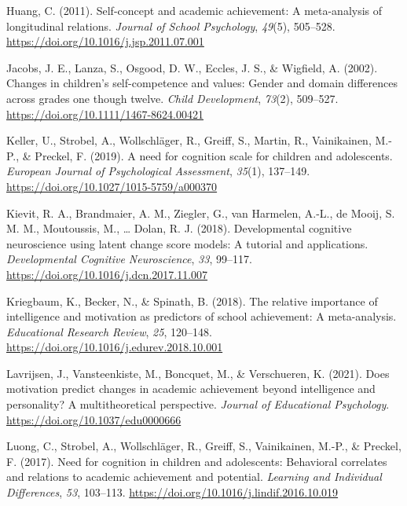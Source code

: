 \documentclass[
  man]{apa6}
\newlength{\cslhangindent}
\newlength{\cslentryspacingunit} %
\newenvironment{CSLReferences}[2] %
 {%
  \setlength{\parindent}{0pt}
  \ifodd #1
  \let\oldpar\par
  \def\par{\hangindent=\cslhangindent\oldpar}
  \fi
  \setlength{\parskip}{#2\cslentryspacingunit}
 }%
 {}
\begin{document}
\begin{CSLReferences}{1}{0}
\leavevmode{}%
Huang, C. (2011). Self-concept and academic achievement: A meta-analysis of longitudinal relations. \emph{Journal of School Psychology}, \emph{49}(5), 505--528. \url{https://doi.org/10.1016/j.jsp.2011.07.001}

\leavevmode{}%
Jacobs, J. E., Lanza, S., Osgood, D. W., Eccles, J. S., \& Wigfield, A. (2002). Changes in children's self-competence and values: Gender and domain differences across grades one though twelve. \emph{Child Development}, \emph{73}(2), 509--527. \url{https://doi.org/10.1111/1467-8624.00421}

\leavevmode{}%
Keller, U., Strobel, A., Wollschläger, R., Greiff, S., Martin, R., Vainikainen, M.-P., \& Preckel, F. (2019). A need for cognition scale for children and adolescents. \emph{European Journal of Psychological Assessment}, \emph{35}(1), 137--149. \url{https://doi.org/10.1027/1015-5759/a000370}

\leavevmode{}%
Kievit, R. A., Brandmaier, A. M., Ziegler, G., van Harmelen, A.-L., de Mooij, S. M. M., Moutoussis, M., \ldots{} Dolan, R. J. (2018). Developmental cognitive neuroscience using latent change score models: A tutorial and applications. \emph{Developmental Cognitive Neuroscience}, \emph{33}, 99--117. \url{https://doi.org/10.1016/j.dcn.2017.11.007}

\leavevmode{}%
Kriegbaum, K., Becker, N., \& Spinath, B. (2018). The relative importance of intelligence and motivation as predictors of school achievement: A meta-analysis. \emph{Educational Research Review}, \emph{25}, 120--148. \url{https://doi.org/10.1016/j.edurev.2018.10.001}

\leavevmode{}%
Lavrijsen, J., Vansteenkiste, M., Boncquet, M., \& Verschueren, K. (2021). Does motivation predict changes in academic achievement beyond intelligence and personality? A multitheoretical perspective. \emph{Journal of Educational Psychology}. \url{https://doi.org/10.1037/edu0000666}

\leavevmode{}%
Luong, C., Strobel, A., Wollschläger, R., Greiff, S., Vainikainen, M.-P., \& Preckel, F. (2017). Need for cognition in children and adolescents: Behavioral correlates and relations to academic achievement and potential. \emph{Learning and Individual Differences}, \emph{53}, 103--113. \url{https://doi.org/10.1016/j.lindif.2016.10.019}


\end{CSLReferences}
\end{document}
